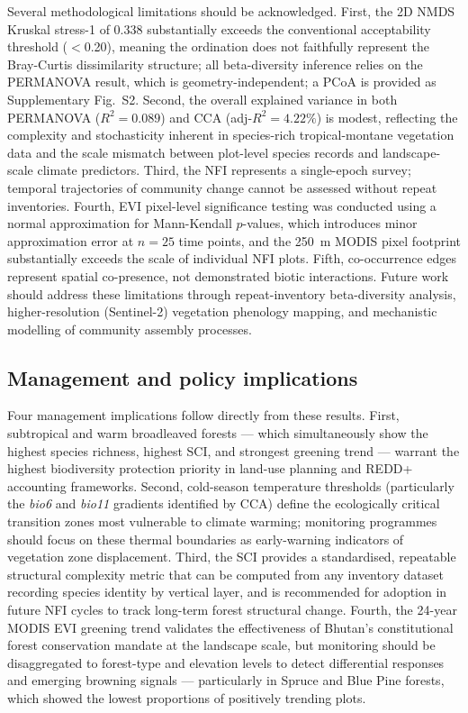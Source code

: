 \documentclass[review,12pt,a4paper]{elsarticle}
\begin{document}
Several methodological limitations should be acknowledged. First, the 2D NMDS
Kruskal stress-1 of 0.338 substantially exceeds the conventional acceptability
threshold ($<$0.20), meaning the ordination does not faithfully represent the
Bray-Curtis dissimilarity structure; all beta-diversity inference relies on the
PERMANOVA result, which is geometry-independent; a PCoA is provided as
Supplementary Fig.~S2. Second, the overall explained variance in both PERMANOVA
($R^2 = 0.089$) and CCA (adj-$R^2 = 4.22\%$) is modest, reflecting the
complexity and stochasticity inherent in species-rich tropical-montane
vegetation data and the scale mismatch between plot-level species records and
landscape-scale climate predictors. Third, the NFI represents a single-epoch
survey; temporal trajectories of community change cannot be assessed without
repeat inventories. Fourth, EVI pixel-level significance testing was conducted
using a normal approximation for Mann-Kendall $p$-values, which introduces
minor approximation error at $n = 25$ time points, and the 250~m MODIS pixel
footprint substantially exceeds the scale of individual NFI plots. Fifth,
co-occurrence edges represent spatial co-presence, not demonstrated biotic
interactions. Future work should address these limitations through
repeat-inventory beta-diversity analysis, higher-resolution (Sentinel-2)
vegetation phenology mapping, and mechanistic modelling of community assembly
processes.

\subsection{Management and policy implications}
\label{sec:disc_management}

Four management implications follow directly from these results. First,
subtropical and warm broadleaved forests --- which simultaneously show the
highest species richness, highest SCI, and strongest greening trend --- warrant
the highest biodiversity protection priority in land-use planning and REDD+
accounting frameworks. Second, cold-season temperature thresholds (particularly
the \textit{bio6} and \textit{bio11} gradients identified by CCA) define the
ecologically critical transition zones most vulnerable to climate warming;
monitoring programmes should focus on these thermal boundaries as early-warning
indicators of vegetation zone displacement. Third, the SCI provides a
standardised, repeatable structural complexity metric that can be computed from
any inventory dataset recording species identity by vertical layer, and is
recommended for adoption in future NFI cycles to track long-term forest
structural change. Fourth, the 24-year MODIS EVI greening trend validates the
effectiveness of Bhutan's constitutional forest conservation mandate at the
landscape scale, but monitoring should be disaggregated to forest-type and
elevation levels to detect differential responses and emerging browning signals
--- particularly in Spruce and Blue Pine forests, which showed the lowest
proportions of positively trending plots.
\end{document}
